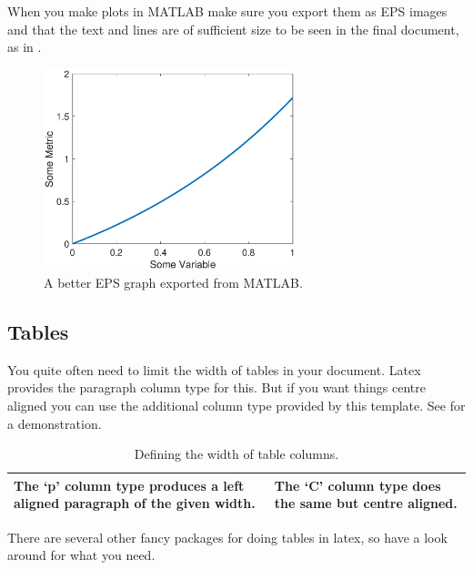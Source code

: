 \documentclass{BCUDissertation}
\begin{document}
\begin{appendices}
        When you make plots in MATLAB make sure you export them as EPS images and that the text and lines are of sufficient size to be seen in the final document, as in .

        \begin{figure}[ht!]
            \centering
            \includegraphics[width=0.65\textwidth]{Images/a_graph.eps}
            \caption{A better EPS graph exported from MATLAB.}
            \label{fig:BetterGraph}
        \end{figure}
    
    \subsection{Tables}
    \label{sec:Tables}
        You quite often need to limit the width of tables in your document. Latex provides the paragraph column type for this. But if you want things centre aligned you can use the additional column type provided by this template. See  for a demonstration.
    
        \begin{table}[ht!]
            \centering
            \begin{tabular}{|p{4cm}|C{4cm}|}
                \hline
                The `p' column type produces a left aligned paragraph of the given width. & The `C' column type does the same but centre aligned. \tabularnewline
                \hline
            \end{tabular}
            \caption{Defining the width of table columns.}
            \label{tab:ColumnTypes}
        \end{table}
    
        There are several other fancy packages for doing tables in latex, so have a look around for what you need.

\end{appendices}
\end{document}
